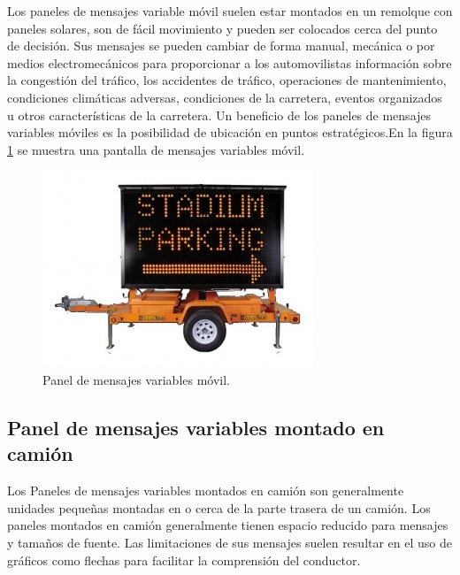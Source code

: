 Los paneles de mensajes variable móvil suelen estar montados en un remolque con paneles solares, son de fácil movimiento y pueden ser colocados cerca del punto de decisión. Sus mensajes se pueden cambiar de forma manual, mecánica o por medios electromecánicos para proporcionar a los automovilistas información sobre la congestión del tráfico, los accidentes de tráfico, operaciones de mantenimiento, condiciones climáticas adversas, condiciones de la carretera, eventos organizados u otros características de la carretera. Un beneficio de los paneles de mensajes variables móviles es la posibilidad de ubicación en puntos estratégicos.En la figura \ref{fig:vmsm} se muestra una pantalla de mensajes variables móvil\citep{VMSTYPES}.

\begin{figure}[htpb]
	\centering
	\includegraphics[width=.7\textwidth]{../Figures/vmsmovil.jpg} 
	\caption{Panel de mensajes variables móvil\protect\footnotemark.}
	\label{fig:vmsm}
\end{figure}



\subsection{Panel de mensajes variables montado en camión}

Los Paneles de mensajes variables montados en camión son generalmente unidades pequeñas montadas en o cerca de la parte trasera de un camión. Los paneles montados en camión generalmente tienen espacio reducido para mensajes y tamaños de fuente. Las limitaciones de sus mensajes suelen resultar en el uso de gráficos como flechas para facilitar la comprensión del conductor\citep{VMSTYPES}.

